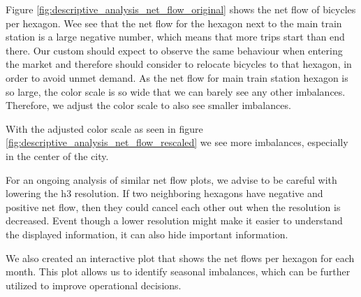 Figure \ref{fig:descriptive_analysis_net_flow_original} shows the net flow of
bicycles per hexagon. Wee see that the net flow for the hexagon next to the
main train station is a large negative number, which means that more trips
start than end there. Our custom should expect to observe the same behaviour 
when entering the market and therefore should consider to relocate bicycles 
to that hexagon, in order to avoid unmet demand.
As the net flow for main train station hexagon is so large, the color scale is
so wide that we can barely see any other imbalances.
Therefore, we adjust the color scale to also see smaller imbalances.

With the adjusted color scale as seen in figure
\ref{fig:descriptive_analysis_net_flow_rescaled} we see more imbalances,
especially in the center of the city.

For an ongoing analysis of similar net flow plots, we advise to be careful with lowering the h3 resolution.
If two neighboring hexagons have negative and positive net flow, then they could cancel each other out when the resolution is decreased. 
Event though a lower resolution might make it easier to understand the displayed information, it can also hide important information.  

We also created an interactive plot that shows the net flows per hexagon for each month.
This plot allows us to identify seasonal imbalances, which can be further utilized to improve operational decisions.

